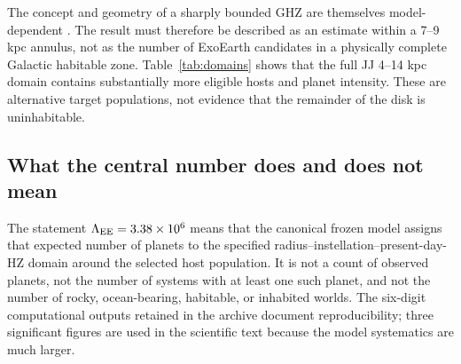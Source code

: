 The concept and geometry of a sharply bounded GHZ are themselves model-dependent \citep{Prantzos2008,Gowanlock2011}. The result must therefore be described as an estimate within a 7--9 kpc annulus, not as the number of ExoEarth candidates in a physically complete Galactic habitable zone. Table~\ref{tab:domains} shows that the full JJ 4--14 kpc domain contains substantially more eligible hosts and planet intensity. These are alternative target populations, not evidence that the remainder of the disk is uninhabitable.

\subsection{What the central number does and does not mean}

The statement $\Lambda_{\rm EE}=3.38\times10^6$ means that the canonical frozen model assigns that expected number of planets to the specified radius--instellation--present-day-HZ domain around the selected host population. It is not a count of observed planets, not the number of systems with at least one such planet, and not the number of rocky, ocean-bearing, habitable, or inhabited worlds. The six-digit computational outputs retained in the archive document reproducibility; three significant figures are used in the scientific text because the model systematics are much larger.
